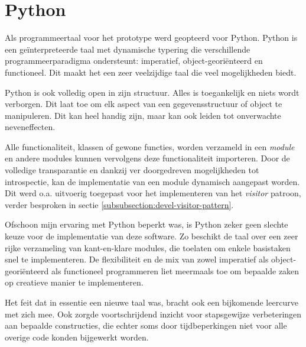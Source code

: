 
\section{Python}
\label{section:devel-python}

Als programmeertaal voor het prototype werd geopteerd voor Python. Python is
een ge\"interpreteerde taal met dynamische typering die verschillende
programmeerparadigma ondersteunt: imperatief, object-geori\"enteerd en
functioneel. Dit maakt het een zeer veelzijdige taal die veel mogelijkheden
biedt.

Python is ook volledig open in zijn structuur. Alles is toegankelijk en niets
wordt verborgen. Dit laat toe om elk aspect van een gegevensstructuur of object
te manipuleren. Dit kan heel handig zijn, maar kan ook leiden tot onverwachte
neveneffecten.

Alle functionaliteit, klassen of gewone functies, worden verzameld in een
\emph{module} en andere modules kunnen vervolgens deze functionaliteit
importeren. Door de volledige transparantie en dankzij ver doorgedreven
mogelijkheden tot introspectie, kan de implementatie van een module dynamisch
aangepast worden. Dit werd o.a. uitvoerig toegepast voor het implementeren van
het \emph{visitor} patroon, verder besproken in sectie
\ref{subsubsection:devel-visitor-pattern}.

Ofschoon mijn ervaring met Python beperkt was, is Python zeker geen slechte
keuze voor de implementatie van deze software. Zo beschikt de taal over een
zeer rijke verzameling van kant-en-klare modules, die toelaten om enkele
basistaken snel te implementeren. De flexibiliteit en de mix van zowel
imperatief als object-geori\"enteerd als functioneel programmeren liet
meermaals toe om bepaalde zaken op creatieve manier te implementeren.

Het feit dat in essentie een nieuwe taal was, bracht ook een bijkomende
leercurve met zich mee. Ook zorgde voortschrijdend inzicht voor stapsgewijze
verbeteringen aan bepaalde constructies, die echter soms door tijdbeperkingen
niet voor alle overige code konden bijgewerkt worden.
